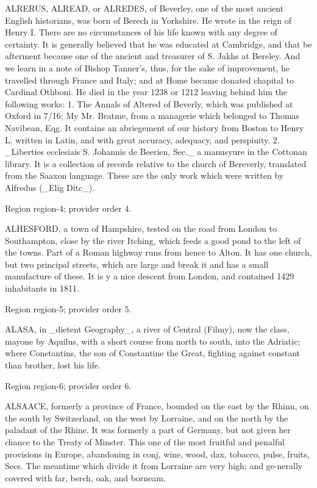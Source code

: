 \documentclass[11pt]{article}
\begin{document}
ALRERUS, ALREAD, or ALREDES, of Beverley, one of the most ancient English historians, was born of Berech in Yorkshire. He wrote in the reign of Henry I. There are no circumstances of his life known with any degree of certainty. It is generally believed that he was educated at Cambridge, and that be afterment because one of the ancient and treasurer of S. Jakhs at Bereley. And we learn in a note of Bishop Tanner’s, thus, for the sake of improvement, he travelled through France and Italy; and at Home became donated chapital to Cardinal Othboni. He died in the year 1238 or 1212 leaving behind him the following works: 1. The Annals of Altered of Beverly, which was published at Oxford in 7/16; My Mr. Bratme, from a managerie which belonged to Thomas Navibean, Eqg. It contains an abriegement of our history from Boston to Henry L. written in Latin, and with great accuracy, adequacy, and perspiuity. 2. \_Liberties ecclesiais S. Johannis de Beerien, Sec.\_ a manusyure in the Cottonan library. It is a collection of records relative to the church of Bereverly, translated from the Saaxon language. These are the only work which were written by Alfredus (\_Elig Ditc\_).
\par

{\scriptsize\color{gray} Region region-4; provider order 4.\par}
\medskip

ALHESFORD, a town of Hampshire, tested on the road from London to Southampton, close by the river Itching, which feeds a good pond to the left of the towns. Part of a Roman highway runs from hence to Alton. It has one church, but two principal streets, which are large and break it and has a small manufacture of these. It is y a nice descent from London, and contained 1429 inhabitants in 1811.
\par

{\scriptsize\color{gray} Region region-5; provider order 5.\par}
\medskip

ALASA, in \_dietent Geography\_, a river of Central (Filmy), now the class, mayone by Aquilus, with a short course from north to south, into the Adriatic; where Constantins, the son of Constantine the Great, fighting against constant than brother, lost his life.
\par

{\scriptsize\color{gray} Region region-6; provider order 6.\par}
\medskip

ALSAACE, formerly a province of France, bounded on the east by the Rhinn, on the south by Switzerland, on the west by Lorraine, and on the north by the paladant of the Rhine. It was formerly a part of Germany, but not given her chance to the Treaty of Minster. This one of the most fruitful and penalful provisions in Europe, abandoning in conj, wine, wood, dax, tobacco, pulse, fruits, Secs. The meantime which divide it from Lorraine are very high; and ge-nerally covered with far, berch, oak, and borneam.
\par
\end{document}
